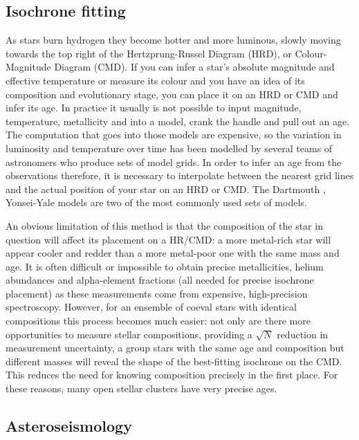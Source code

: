 \subsection{Isochrone fitting}

As stars burn hydrogen they become hotter and more luminous, slowly moving
towards the top right of the Hertzprung-Russel Diagram (HRD), or
Colour-Magnitude Diagram (CMD).
If you can infer a star's absolute magnitude and effective temperature or
measure its colour and you have an idea of its composition and evolutionary
stage, you can place it on an HRD or CMD and infer its age.
In practice it usually is not possible to input magnitude, temperature,
metallicity and \logg into a model, crank the handle and pull out an age.
The computation that goes into those models are expensive, so the variation in
luminosity and temperature over time has been modelled by several teams of
astronomers who produce sets of model grids.
In order to infer an age from the observations therefore, it is necessary to
interpolate between the nearest grid lines and the actual position of your
star on an HRD or CMD.
The Dartmouth \citep{dotter}, Yonsei-Yale \citep{spada} models are two of the
most commonly used sets of models.

An obvious limitation of this method is that the composition of the star in
question will affect its placement on a HR/CMD: a more metal-rich star will
appear cooler and redder than a more metal-poor one with the same mass and
age.
It is often difficult or impossible to obtain precise metallicities, helium
abundances and alpha-element fractions (all needed for precise isochrone
placement) as these measurements come from expensive, high-precision
spectroscopy.
However, for an ensemble of coeval stars with identical compositions this
process becomes much easier: not only are there more opportunities to measure
stellar compositions, providing a $\sqrt N$ reduction in measurement
uncertainty, a group stars with the same age and composition but different
masses will reveal the shape of the best-fitting isochrone on the CMD\@.
This reduces the need for knowing composition precisely in the first place.
For these reasons, many open stellar clusters have very precise ages.


\subsection{Asteroseismology}

